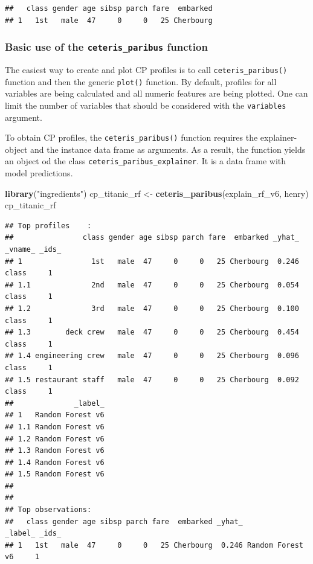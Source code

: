 \documentclass[12pt,]{krantz}
\newenvironment{Shaded}{\begin{snugshade}}{\end{snugshade}}
\newcommand{\KeywordTok}[1]{\textcolor[rgb]{0.13,0.29,0.53}{\textbf{#1}}}
\newcommand{\NormalTok}[1]{#1}
\newcommand{\StringTok}[1]{\textcolor[rgb]{0.31,0.60,0.02}{#1}}
\begin{document}
\begin{verbatim}
##   class gender age sibsp parch fare  embarked
## 1   1st   male  47     0     0   25 Cherbourg
\end{verbatim}

\hypertarget{basic-use-of-the-ceteris_paribus-function}{%
\subsubsection{\texorpdfstring{Basic use of the \texttt{ceteris\_paribus} function}{Basic use of the ceteris\_paribus function}}\label{basic-use-of-the-ceteris_paribus-function}}

The easiest way to create and plot CP profiles is to call \texttt{ceteris\_paribus()} function and then the generic \texttt{plot()} function. By default, profiles for all variables are being calculated and all numeric features are being plotted. One can limit the number of variables that should be considered with the \texttt{variables} argument.

To obtain CP profiles, the \texttt{ceteris\_paribus()} function requires the explainer-object and the instance data frame as arguments. As a result, the function yields an object od the class \texttt{ceteris\_paribus\_explainer}. It is a data frame with model predictions.

\begin{Shaded}
\begin{Highlighting}[]
\KeywordTok{library}\NormalTok{(}\StringTok{"ingredients"}\NormalTok{)}
\NormalTok{cp_titanic_rf <-}\StringTok{ }\KeywordTok{ceteris_paribus}\NormalTok{(explain_rf_v6, henry)}
\NormalTok{cp_titanic_rf}
\end{Highlighting}
\end{Shaded}

\begin{verbatim}
## Top profiles    : 
##                class gender age sibsp parch fare  embarked _yhat_ _vname_ _ids_
## 1                1st   male  47     0     0   25 Cherbourg  0.246   class     1
## 1.1              2nd   male  47     0     0   25 Cherbourg  0.054   class     1
## 1.2              3rd   male  47     0     0   25 Cherbourg  0.100   class     1
## 1.3        deck crew   male  47     0     0   25 Cherbourg  0.454   class     1
## 1.4 engineering crew   male  47     0     0   25 Cherbourg  0.096   class     1
## 1.5 restaurant staff   male  47     0     0   25 Cherbourg  0.092   class     1
##              _label_
## 1   Random Forest v6
## 1.1 Random Forest v6
## 1.2 Random Forest v6
## 1.3 Random Forest v6
## 1.4 Random Forest v6
## 1.5 Random Forest v6
## 
## 
## Top observations:
##   class gender age sibsp parch fare  embarked _yhat_          _label_ _ids_
## 1   1st   male  47     0     0   25 Cherbourg  0.246 Random Forest v6     1
\end{verbatim}
\end{document}
